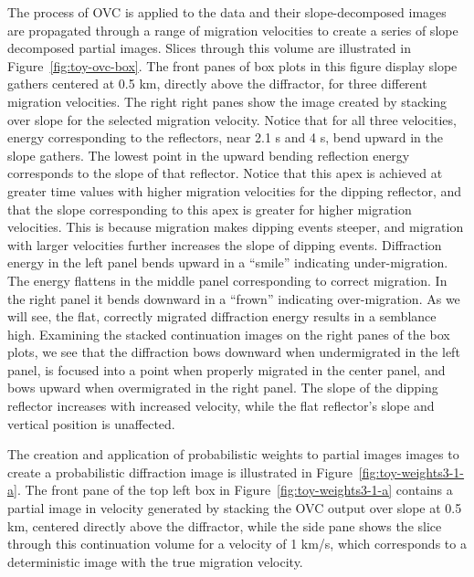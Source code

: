 The process of OVC is applied to the data and their slope-decomposed images are propagated through a range of migration velocities to create a series of slope decomposed partial images.
 Slices through this volume are illustrated in  Figure~\ref{fig:toy-ovc-box}. The front panes of box plots in this figure display slope gathers centered at 0.5 km, directly above the diffractor, for three different migration velocities.
The right right panes show the image created by stacking over slope for the selected migration velocity.   
Notice that for all three velocities, energy corresponding to the reflectors, near 2.1 s and 4 s, bend upward in the slope gathers.  The lowest point in the upward bending reflection energy corresponds to the slope of that reflector.  Notice that this apex is achieved at greater time values with higher migration velocities for the dipping reflector, and that the slope corresponding to this apex is greater for higher migration velocities.  This is because migration makes dipping events steeper, and migration with larger velocities further increases the slope of dipping events.  Diffraction energy in the left panel bends upward in a ``smile'' indicating under-migration.  The energy flattens in the middle panel corresponding to correct migration.  In the right panel it bends downward in a ``frown'' indicating over-migration.  As we will see, the flat, correctly migrated diffraction energy results in a semblance high.  Examining the stacked continuation images on the right panes of the box plots, we see that the diffraction bows downward when undermigrated in the left panel, is focused into a point when properly migrated in the center panel, and bows upward when overmigrated in the right panel.  The slope of the dipping reflector increases with increased velocity, while the flat reflector's slope and vertical position is unaffected.


The creation and application of probabilistic weights to partial images images to create a probabilistic diffraction image is illustrated in Figure~\ref{fig:toy-weights3-1-a}.  The front pane of the top left box in Figure~\ref{fig:toy-weights3-1-a} contains a partial image in velocity generated by stacking the OVC output over slope at 0.5 km, centered directly above the diffractor, while the side pane shows the slice through this continuation volume for a velocity of 1 km/s, 
which corresponds to a deterministic image with the true migration velocity.  


